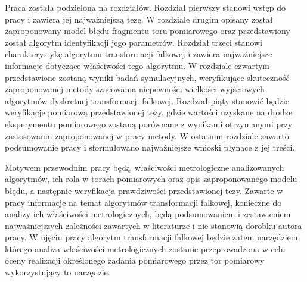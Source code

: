 Praca została podzielona na  rozdziałów. Rozdział pierwszy stanowi wstęp do pracy i zawiera jej najważniejszą tezę. W rozdziale drugim opisany został zaproponowany model błędu fragmentu toru pomiarowego oraz przedstawiony został algorytm identyfikacji jego parametrów. Rozdział trzeci stanowi charakterystykę algorytmu transformacji falkowej i zawiera najważniejsze informacje dotyczące właściwości tego algorytmu. W rozdziale czwartym przedstawione zostaną wyniki badań symulacyjnych, weryfikujące skuteczność zaproponowanej metody szacowania niepewności wielkości wyjściowych algorytmów dyskretnej transformacji falkowej. Rozdział piąty stanowić będzie weryfikacje pomiarową przedstawionej tezy, gdzie wartości uzyskane na drodze eksperymentu pomiarowego zostaną porównane z wynikami otrzymanymi przy zastosowaniu zaproponowanej w pracy metody. W ostatnim rozdziale zawarto podsumowanie pracy i sformułowano najważniejsze wnioski płynące z jej treści.

Motywem przewodnim pracy będą właściwości metrologiczne analizowanych algorytmów, ich rola w torach pomiarowych oraz opis zaproponowanego modelu błędu, a następnie weryfikacja prawdziwości przedstawionej tezy. Zawarte w pracy informacje na temat algorytmów transformacji falkowej, konieczne do analizy ich właściwości metrologicznych, będą podsumowaniem i zestawieniem najważniejszych zależności zawartych w literaturze i nie stanowią dorobku autora pracy. W ujęciu pracy algorytm transformacji falkowej będzie zatem narzędziem, którego analiza właściwości metrologicznych zostanie przeprowadzona w celu oceny realizacji określonego zadania pomiarowego przez tor pomiarowy wykorzystujący to narzędzie.

